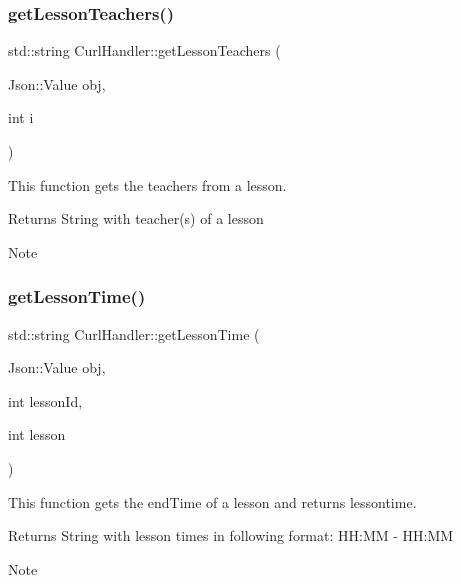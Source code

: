 \subsubsection{\texorpdfstring{get\+Lesson\+Teachers()}{getLessonTeachers()}}
{\footnotesize\ttfamily std\+::string Curl\+Handler\+::get\+Lesson\+Teachers (\begin{DoxyParamCaption}\item[{Json\+::\+Value}]{obj,  }\item[{int}]{i }\end{DoxyParamCaption})}



This function gets the teachers from a lesson. 

\begin{DoxyReturn}{Returns}
String with teacher(s) of a lesson 
\end{DoxyReturn}
\begin{DoxyNote}{Note}

\end{DoxyNote}
\mbox{\label{classCurlHandler_aa62b036298bc0ca7365cb32919996a54}} 
\subsubsection{\texorpdfstring{get\+Lesson\+Time()}{getLessonTime()}}
{\footnotesize\ttfamily std\+::string Curl\+Handler\+::get\+Lesson\+Time (\begin{DoxyParamCaption}\item[{Json\+::\+Value}]{obj,  }\item[{int}]{lesson\+Id,  }\item[{int}]{lesson }\end{DoxyParamCaption})}



This function gets the end\+Time of a lesson and returns lessontime. 

\begin{DoxyReturn}{Returns}
String with lesson times in following format\+: HH\+:MM -\/ HH\+:MM 
\end{DoxyReturn}
\begin{DoxyNote}{Note}

\end{DoxyNote}
\mbox{\label{classCurlHandler_af6808f78b075e81747be9ff5c19a8b61}} 
